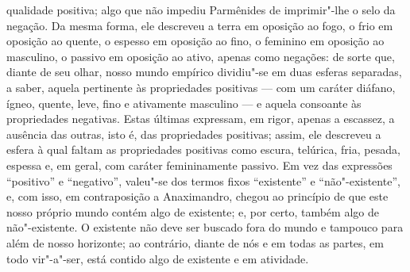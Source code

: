 qualidade positiva; algo que não impediu Parmênides de imprimir"-lhe o selo
da negação. Da mesma forma, ele descreveu a terra em oposição ao fogo, o frio
em oposição ao quente, o espesso em oposição ao fino, o feminino em oposição
ao masculino, o passivo em oposição ao ativo, apenas como negações: de sorte
que, diante de seu olhar, nosso mundo empírico dividiu"-se em duas esferas
separadas, a saber, aquela pertinente às propriedades positivas --- com um
caráter diáfano, ígneo, quente, leve, fino e ativamente masculino --- e aquela
consoante às propriedades negativas. Estas últimas expressam, em rigor,
apenas a escassez, a ausência das outras, isto é, das propriedades positivas;
assim, ele descreveu a esfera à qual faltam as propriedades positivas como
escura, telúrica, fria, pesada, espessa e, em geral, com caráter
femininamente passivo. Em vez das expressões ``positivo'' e ``negativo'',
valeu"-se dos termos fixos ``existente'' e ``não"-existente'', e, com isso,
em contraposição a Anaximandro, chegou ao princípio de que este nosso próprio
mundo contém algo de existente; e, por certo, também algo de não"-existente.
O existente não deve ser buscado fora do mundo e tampouco para além de nosso
horizonte; ao contrário, diante de nós e em todas as partes, em todo
vir"-a"-ser, está contido algo de existente e em atividade.

